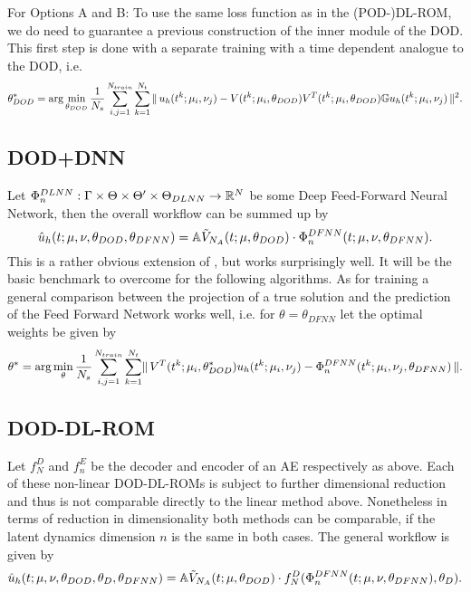 For Options A and B: To use the same loss function as in the (POD-)DL-ROM, we do need to guarantee a previous construction of the inner module of the DOD. This first step is done with a separate training with a time dependent analogue to the DOD, i.e.
\begin{equation}
    \theta_{DOD}^* = \operatorname{arg}\min_{\theta_{DOD}} \frac{1}{N_s} \sum_{i,j = 1}^{N_{train}} \sum_{k = 1}^{N_t} \, \lVert \, u_h(t^k; \mu_i, \nu_j) - V(t^k; \mu_i, \theta_{DOD}) V^T(t^k; \mu_i, \theta_{DOD}) \mathbb{G} u_h(t^k; \mu_i, \nu_j) \, \rVert^2.
\end{equation}

\subsection{DOD+DNN} \label{subsec: DOD+DNN}

Let $\Phi_n^{DLNN}: \Gamma \times \Theta \times \Theta' \times \Theta_{DLNN} \to \mathbb{R}^{N}$ be some Deep Feed-Forward Neural Network, then the overall workflow can be summed up by
\begin{equation}
    \hat{u}_h(t; \mu, \nu, \theta_{DOD}, \theta_{DFNN}) = \mathbb{A} \Tilde{V}_{N_A}(t; \mu, \theta_{DOD}) \cdot \Phi_n^{DFNN}(t; \mu, \nu, \theta_{DFNN}).
\end{equation}
This is a rather obvious extension of \cite{DOD}, but works surprisingly well. It will be the basic benchmark to overcome for the following algorithms. As for training a general comparison between the projection of a true solution and the prediction of the Feed Forward Network works well, i.e. for $\theta = \theta_{DFNN}$ let the optimal weights be given by
\begin{equation}
    \theta^* = \operatorname{arg}\min_\theta \frac{1}{N_s} \sum_{i, j = 1}^{N_{train}} \sum_{k = 1}^{N_t} \lVert \, V^T(t^k; \mu_i, \theta^*_{DOD}) u_h(t^k; \mu_i, \nu_j) - \Phi_n^{DFNN}(t^k; \mu_i, \nu_j, \theta_{DFNN}) \, \rVert.
\end{equation}

\subsection{DOD-DL-ROM}

Let $f_N^D$ and $f_n^E$ be the decoder and encoder of an AE respectively as above. Each of these non-linear DOD-DL-ROMs is subject to further dimensional reduction and thus is not comparable directly to the linear method above. Nonetheless in terms of reduction in dimensionality both methods can be comparable, if the latent dynamics dimension $n$ is the same in both cases. The general workflow is given by
\begin{equation}
    \hat{u}_h(t; \mu, \nu, \theta_{DOD}, \theta_D, \theta_{DFNN}) = \mathbb{A} \Tilde{V}_{N_A}(t; \mu, \theta_{DOD}) \cdot f_N^D(\Phi_n^{DFNN}(t; \mu, \nu, \theta_{DFNN}), \theta_{D}).
\end{equation}

